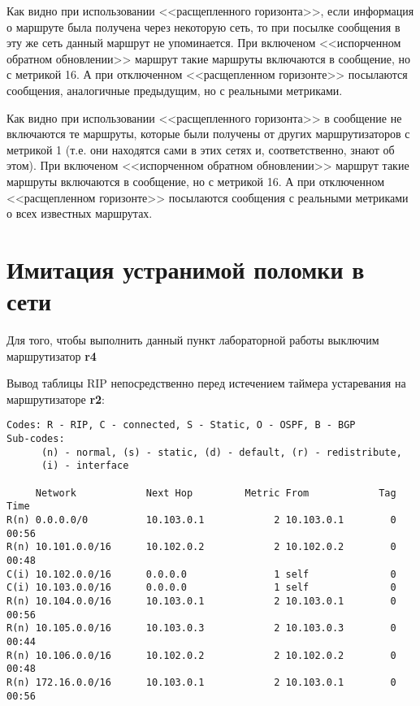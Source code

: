 \documentclass[a4paper,12pt]{article}
\begin{document}
Как видно при использовании <<расщепленного горизонта>>, если информация о
маршруте была получена через некоторую сеть, то при посылке сообщения в эту же сеть данный маршрут не упоминается. При включеном <<испорченном обратном
обновлении>> маршрут такие маршруты включаются в сообщение, но с метрикой 16.
А при отключенном <<расщепленном горизонте>> посылаются сообщения,
аналогичные предыдущим, но с реальными метриками.

Как видно при использовании <<расщепленного горизонта>> в сообщение не
включаются те маршруты, которые были получены от других маршрутизаторов
с метрикой 1 (т.е. они находятся сами в этих сетях и, соответственно, знают об этом).
При включеном <<испорченном обратном обновлении>> маршрут такие маршруты
включаются в сообщение, но с метрикой 16. А при отключенном <<расщепленном
горизонте>> посылаются сообщения с реальными метриками о всех известных
маршрутах.

\section{Имитация устранимой поломки в сети}

Для того, чтобы выполнить данный пункт лабораторной работы выключим
маршрутизатор \textbf{r4}

Вывод таблицы RIP непосредственно перед истечением таймера устаревания на маршрутизаторе \textbf{r2}:
\begin{Verbatim}
Codes: R - RIP, C - connected, S - Static, O - OSPF, B - BGP
Sub-codes:
      (n) - normal, (s) - static, (d) - default, (r) - redistribute,
      (i) - interface

     Network            Next Hop         Metric From            Tag Time
R(n) 0.0.0.0/0          10.103.0.1            2 10.103.0.1        0 00:56
R(n) 10.101.0.0/16      10.102.0.2            2 10.102.0.2        0 00:48
C(i) 10.102.0.0/16      0.0.0.0               1 self              0
C(i) 10.103.0.0/16      0.0.0.0               1 self              0
R(n) 10.104.0.0/16      10.103.0.1            2 10.103.0.1        0 00:56
R(n) 10.105.0.0/16      10.103.0.3            2 10.103.0.3        0 00:44
R(n) 10.106.0.0/16      10.102.0.2            2 10.102.0.2        0 00:48
R(n) 172.16.0.0/16      10.103.0.1            2 10.103.0.1        0 00:56
\end{Verbatim}
\end{document}
